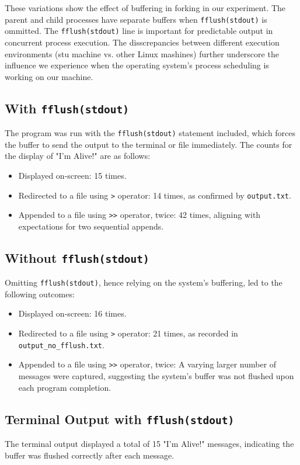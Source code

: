 \documentclass[12pt]{article}
\begin{document}
These variations show the effect of buffering in forking in our experiment. The parent and child processes have separate buffers when \texttt{fflush(stdout)} is ommitted. The \texttt{fflush(stdout)} line is important for predictable output in concurrent process execution. The disscrepancies between different execution environments (stu machine vs. other Linux mashines) further underscore the influence we experience when the operating system's process scheduling is working on our machine.

\subsection{With \texttt{fflush(stdout)}}
The program was run with the \texttt{fflush(stdout)} statement included, which forces the buffer to send the output to the terminal or file immediately. The counts for the display of "I'm Alive!" are as follows:
\begin{itemize}
  \item Displayed on-screen: 15 times.
  \item Redirected to a file using \texttt{>} operator: 14 times, as confirmed by \texttt{output.txt}.
  \item Appended to a file using \texttt{>>} operator, twice: 42 times, aligning with expectations for two sequential appends.
\end{itemize}

\subsection{Without \texttt{fflush(stdout)}}
Omitting \texttt{fflush(stdout)}, hence relying on the system's buffering, led to the following outcomes:
\begin{itemize}
  \item Displayed on-screen: 16 times.
  \item Redirected to a file using \texttt{>} operator: 21 times, as recorded in \texttt{output\_no\_fflush.txt}.
  \item Appended to a file using \texttt{>>} operator, twice: A varying larger number of messages were captured, suggesting the system's buffer was not flushed upon each program completion.
\end{itemize}

\subsection{Terminal Output with \texttt{fflush(stdout)}}
The terminal output displayed a total of 15 "I'm Alive!" messages, indicating the buffer was flushed correctly after each message.
\end{document}
